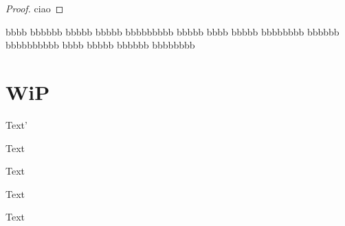 \documentclass[a4paper,12pt]{article}
\begin{document}
\begin{proof}
ciao
\end{proof}

\begin{definition}[Bu]
bbbb bbbbbb bbbbb bbbbb bbbbbbbbb bbbbb bbbb bbbbb bbbbbbbb bbbbbb bbbbbbbbbb bbbb bbbbb bbbbbb 
bbbbbbbb
\end{definition}


\section{WiP}

\begin{notationfix}
Text'
\end{notationfix}

\begin{TAM}
Text
\end{TAM}

\begin{example}
Text
\end{example}

\begin{observation}
Text
\end{observation}

\begin{remark}
Text
\end{remark}
\end{document}
